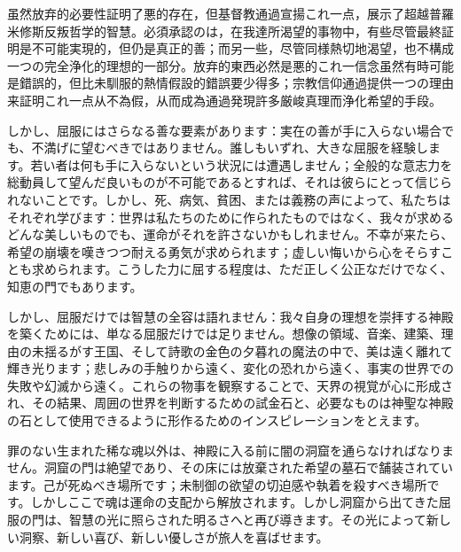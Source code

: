 \documentclass[a4paper,11pt,openany]{ltjsbook}
\begin{document}
虽然放弃的必要性証明了悪的存在，但基督教通過宣揚これ一点，展示了超越普羅米修斯反叛哲学的智慧。必須承認のは，在我達所渴望的事物中，有些尽管最終証明是不可能実現的，但仍是真正的善；而另一些，尽管同様熱切地渴望，也不構成一つの完全浄化的理想的一部分。放弃的東西必然是悪的これ一信念虽然有時可能是錯誤的，但比未馴服的熱情假設的錯誤要少得多；宗教信仰通過提供一つの理由来証明これ一点从不為假，从而成為通過発現許多厳峻真理而浄化希望的手段。

しかし、屈服にはさらなる善な要素があります：実在の善が手に入らない場合でも、不満げに望むべきではありません。誰しもいずれ、大きな屈服を経験します。若い者は何も手に入らないという状況には遭遇しません；全般的な意志力を総動員して望んだ良いものが不可能であるとすれば、それは彼らにとって信じられないことです。しかし、死、病気、貧困、または義務の声によって、私たちはそれぞれ学びます：世界は私たちのために作られたものではなく、我々が求めるどんな美しいものでも、運命がそれを許さないかもしれません。不幸が来たら、希望の崩壊を嘆きつつ耐える勇気が求められます；虚しい悔いから心をそらすことも求められます。こうした力に屈する程度は、ただ正しく公正なだけでなく、知恵の門でもあります。

しかし、屈服だけでは智慧の全容は語れません：我々自身の理想を崇拝する神殿を築くためには、単なる屈服だけでは足りません。想像の領域、音楽、建築、理由の未揺るがす王国、そして詩歌の金色の夕暮れの魔法の中で、美は遠く離れて輝き光ります；悲しみの手触りから遠く、変化の恐れから遠く、事実の世界での失敗や幻滅から遠く。これらの物事を観察することで、天界の視覚が心に形成され、その結果、周囲の世界を判断するための試金石と、必要なものは神聖な神殿の石として使用できるように形作るためのインスピレーションをとえます。

罪のない生まれた稀な魂以外は、神殿に入る前に闇の洞窟を通らなければなりません。洞窟の門は絶望であり、その床には放棄された希望の墓石で舗装されています。己が死ぬべき場所です；未制御の欲望の切迫感や執着を殺すべき場所です。しかしここで魂は運命の支配から解放されます。しかし洞窟から出てきた屈服の門は、智慧の光に照らされた明るさへと再び導きます。その光によって新しい洞察、新しい喜び、新しい優しさが旅人を喜ばせます。
\end{document}
